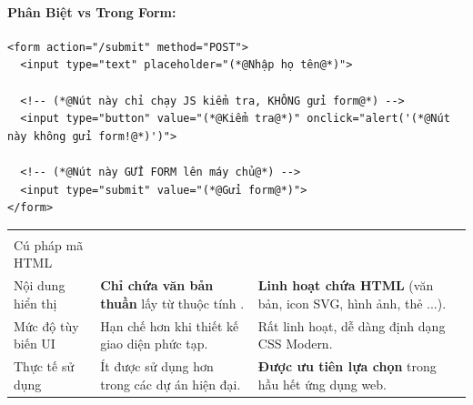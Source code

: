 \paragraph{Phân Biệt  vs  Trong Form:}

\begin{codeWindow}[Form kết hợp cả input type="button" và input type="submit"]
\begin{lstlisting}[language=HTML5]
<form action="/submit" method="POST">
  <input type="text" placeholder="(*@Nhập họ tên@*)">
  
  <!-- (*@Nút này chỉ chạy JS kiểm tra, KHÔNG gửi form@*) -->
  <input type="button" value="(*@Kiểm tra@*)" onclick="alert('(*@Nút này không gửi form!@*)')">
  
  <!-- (*@Nút này GỬI FORM lên máy chủ@*) -->
  <input type="submit" value="(*@Gửi form@*)">
</form>
\end{lstlisting}
\end{codeWindow}

\begin{browserWindow}
\sffamily\small
{} \quad
{} \quad
{}
\end{browserWindow}

\begin{prettyTableBox}[Ma Trận So Sánh \codeinline{<input type="button">} vs \codeinline{<button type="button">}]
\begin{tabularx}{\linewidth}{K{2.8cm} Z Z}
 &  &  \\
Cú pháp mã HTML &  &  \\
Nội dung hiển thị & \textbf{Chỉ chứa văn bản thuần} lấy từ thuộc tính . & \textbf{Linh hoạt chứa HTML} (văn bản, icon SVG, hình ảnh, thẻ ...). \\
Mức độ tùy biến UI & Hạn chế hơn khi thiết kế giao diện phức tạp. & Rất linh hoạt, dễ dàng định dạng CSS Modern. \\
Thực tế sử dụng & Ít được sử dụng hơn trong các dự án hiện đại. & \textbf{Được ưu tiên lựa chọn} trong hầu hết ứng dụng web. \\
\end{tabularx}
\end{prettyTableBox}

